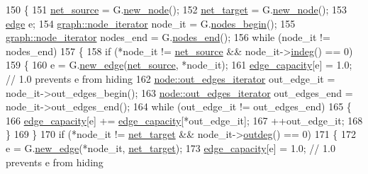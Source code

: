 \begin{DoxyCode}
150 \{
151     \mbox{\hyperlink{classmaxflow__ff_a2e4cc02ce8c9d929f2896525c686d6c1}{net\_source}} = G.\mbox{\hyperlink{classgraph_ab9505335c20558319b6cce25aed23524}{new\_node}}();
152     \mbox{\hyperlink{classmaxflow__ff_a94d5db73364cf5824ec3d3d530b57319}{net\_target}} = G.\mbox{\hyperlink{classgraph_ab9505335c20558319b6cce25aed23524}{new\_node}}();
153     \mbox{\hyperlink{classedge}{edge}} e;
154     \mbox{\hyperlink{classgraph_a2cb374b84c133ce13f94e73c3e5da7fa}{graph::node\_iterator}} node\_it = G.\mbox{\hyperlink{classgraph_aec053a4b509d1be804237a80044c54c0}{nodes\_begin}}();
155     \mbox{\hyperlink{classgraph_a2cb374b84c133ce13f94e73c3e5da7fa}{graph::node\_iterator}} nodes\_end = G.\mbox{\hyperlink{classgraph_abbf9c0cb5629e98e1142254911238173}{nodes\_end}}();
156     \textcolor{keywordflow}{while} (node\_it != nodes\_end)
157     \{
158     \textcolor{keywordflow}{if} (*node\_it != \mbox{\hyperlink{classmaxflow__ff_a2e4cc02ce8c9d929f2896525c686d6c1}{net\_source}} && node\_it->\mbox{\hyperlink{classnode_a749bfd1316584b96f8c9b0e44ad512f0}{indeg}}() == 0)
159     \{
160         e = G.\mbox{\hyperlink{classgraph_a02a0c3a219f75d68caa408ef339d4a1c}{new\_edge}}(\mbox{\hyperlink{classmaxflow__ff_a2e4cc02ce8c9d929f2896525c686d6c1}{net\_source}}, *node\_it);
161         \mbox{\hyperlink{classmaxflow__ff_a5b38943e093c77a57eb70f1a4190b8a6}{edge\_capacity}}[e] = 1.0;    \textcolor{comment}{// 1.0 prevents e from hiding}
162         \mbox{\hyperlink{classnode_a90e17ed34de55072e8077f4367499a98}{node::out\_edges\_iterator}} out\_edge\_it = node\_it->out\_edges\_begin();
163         \mbox{\hyperlink{classnode_a90e17ed34de55072e8077f4367499a98}{node::out\_edges\_iterator}} out\_edges\_end = node\_it->out\_edges\_end();
164         \textcolor{keywordflow}{while} (out\_edge\_it != out\_edges\_end)
165         \{
166         \mbox{\hyperlink{classmaxflow__ff_a5b38943e093c77a57eb70f1a4190b8a6}{edge\_capacity}}[e] += \mbox{\hyperlink{classmaxflow__ff_a5b38943e093c77a57eb70f1a4190b8a6}{edge\_capacity}}[*out\_edge\_it];
167         ++out\_edge\_it;
168         \}
169     \}
170     \textcolor{keywordflow}{if} (*node\_it != \mbox{\hyperlink{classmaxflow__ff_a94d5db73364cf5824ec3d3d530b57319}{net\_target}} && node\_it->\mbox{\hyperlink{classnode_a32adc45c4132e2642ccd2233d79ffe67}{outdeg}}() == 0)
171     \{
172         e = G.\mbox{\hyperlink{classgraph_a02a0c3a219f75d68caa408ef339d4a1c}{new\_edge}}(*node\_it, \mbox{\hyperlink{classmaxflow__ff_a94d5db73364cf5824ec3d3d530b57319}{net\_target}});
173         \mbox{\hyperlink{classmaxflow__ff_a5b38943e093c77a57eb70f1a4190b8a6}{edge\_capacity}}[e] = 1.0;    \textcolor{comment}{// 1.0 prevents e from hiding}

\end{DoxyCode}

